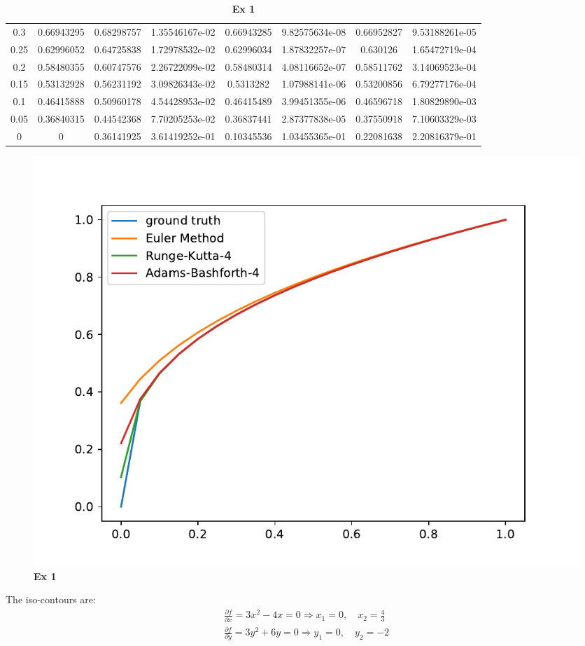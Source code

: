 \documentclass[
  course = {{16-811 Math Fundamentals for Robotics}},
  quartile = {{1}},
  assignment = 4,
  name = {{Kangle Deng}},
  email = {{kangled@andrew.cmu.edu}},
  firstexercise = 1
]{aga-homework}
\begin{document}
\begin{table}[h]
\begin{center}
{\begin{tabular}{c|c|cc|cc|cc}
    0.3 & 0.66943295 & 0.68298757 & 1.35546167e-02 & 0.66943285 & 9.82575634e-08 & 0.66952827 &  9.53188261e-05\\
    0.25 & 0.62996052 & 0.64725838 & 1.72978532e-02 & 0.62996034 & 1.87832257e-07 & 0.630126 &  1.65472719e-04 \\
    0.2 & 0.58480355 & 0.60747576 & 2.26722099e-02 & 0.58480314 & 4.08116652e-07 & 0.58511762 &  3.14069523e-04\\
    0.15 & 0.53132928 & 0.56231192 & 3.09826343e-02 & 0.5313282 & 1.07988141e-06 & 0.53200856 &  6.79277176e-04\\
    0.1 & 0.46415888 & 0.50960178 & 4.54428953e-02 & 0.46415489 & 3.99451355e-06 & 0.46596718 &  1.80829890e-03\\
    0.05 & 0.36840315 & 0.44542368 & 7.70205253e-02 & 0.36837441 & 2.87377838e-05 & 0.37550918 &  7.10603329e-03\\
    0  & 0 & 0.36141925 & 3.61419252e-01 &  0.10345536 &  1.03455365e-01 & 0.22081638 & 2.20816379e-01\\
      \bottomrule
    \end{tabular}
    }
  \end{center}
\caption{\textbf{Ex 1}} 
 \label{tab:hw4_ex1}
\end{table}

\begin{figure}
    \centering
    \includegraphics{math/fig/hw4/ex1.pdf}
    \caption{\textbf{Ex 1}}
    \label{fig:hw4_ex1}
\end{figure}

\exercise
\subexercise
The iso-contours are:
\begin{equation*}
    \begin{aligned}
    \frac{\partial f}{\partial x} = 3x^2 - 4x = 0 \Rightarrow x_1 = 0, \quad x_2 = \frac{4}{3}\\
    \frac{\partial f}{\partial y} = 3y^2 + 6y = 0 \Rightarrow y_1 = 0, \quad y_2 = -2
    \end{aligned}
\end{equation*}
\end{document}
